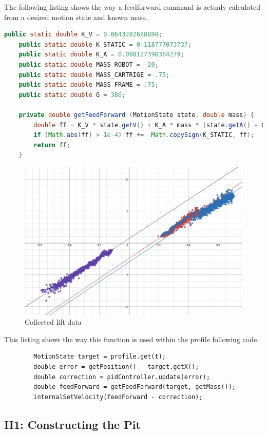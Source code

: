 \documentclass{article}
\begin{document}
The following listing shows the way a feedforward command is actualy calculated from a desired motion state and known mass.
\begin{lstlisting}[language=Java]
    public static double K_V = 0.0643202688898;
    public static double K_STATIC = 0.118777073737;
    public static double K_A = 0.000127390384279;
    public static double MASS_ROBOT = -20;
    public static double MASS_CARTRIGE = .75;
    public static double MASS_FRAME = .75;
    public static double G = 386;

    private double getFeedForward (MotionState state, double mass) {
        double ff = K_V * state.getV() + K_A * mass * (state.getA() - G);
        if (Math.abs(ff) > 1e-4) ff +=  Math.copySign(K_STATIC, ff);
        return ff;
    }
\end{lstlisting}

\begin{figure}
    \centering
    \includegraphics[width=.6\textwidth]{30_03-25/images/graph.png}
    \caption{Collected lift data}
    \label{fig:liftData}
\end{figure}

This listing shows the way this function is used within the profile following code.
\begin{lstlisting}
        MotionState target = profile.get(t);
        double error = getPosition() - target.getX();
        double correction = pidController.update(error);
        double feedForward = getFeedForward(target, getMass());
        internalSetVelocity(feedForward - correction);
\end{lstlisting}

\subsection{H1: Constructing the Pit}
\end{document}
